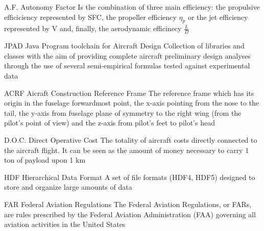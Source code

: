 %
%



  {A.F.}            %
  {Autonomy Factor}  %
  {Is the combination of three main efficiency: the propulsive efficiciency represented by SFC, the propeller efficiency $\eta_{p}$ or the jet efficiency represented by V and, finally, the aerodynamic efficinecy $\frac{L}{D}$} %

  {JPAD}            %
  {Java Program toolchain for Aircraft Design}  %
  {Collection of libraries and classes with the aim of providing complete aircraft preliminary design analyses through the use of several semi-empirical formulas tested against experimental data} %

  {ACRF}            %
  {Aicraft Construction Reference Frame}  %
  {The reference frame which has its origin in the fuselage forwardmost point, the x-axis pointing from the nose to the tail, the y-axis from fuselage plane of symmetry to the right wing (from the pilot's point of view) and the z-axis from pilot's feet to pilot's head} %

%
  {D.O.C.}            %
  {Direct Operative Cost}  %
  {The totality of aircraft costs directly connected to the aircraft flight. It can be seen as the amount of money necessary to carry 1 ton of payload upon 1 km}

%
  {HDF}            %
  {Hierarchical Data Format}  %
  {A set of file formats (HDF4, HDF5) designed to store and organize large amounts of data}
  
%
 {FAR}            %
 {Federal Aviation Regulations}  %
 {The Federal Aviation Regulations, or FARs, are rules prescribed by the Federal Aviation Administration (FAA) governing all aviation activities in the United States}
  
